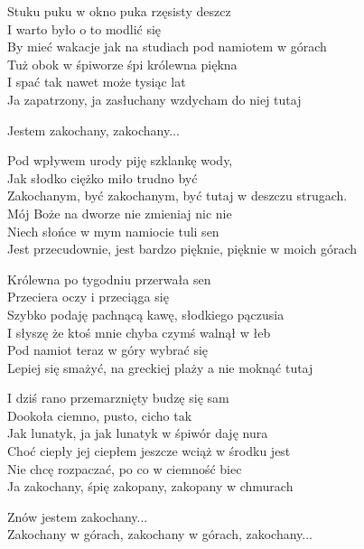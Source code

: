 \begin{text}
 
    Stuku puku w okno puka rzęsisty deszcz\\
    I warto było o to modlić się\\
    By mieć wakacje jak na studiach pod namiotem w górach \\
    Tuż obok w śpiworze śpi królewna piękna\\
    I spać tak nawet może tysiąc lat\\
    Ja zapatrzony, ja zasłuchany wzdycham do niej tutaj

    Jestem zakochany, zakochany...

    Pod wpływem urody piję szklankę wody,\\
    Jak słodko ciężko miło trudno być\\
    Zakochanym, być zakochanym, być tutaj w deszczu strugach.\\
    Mój Boże na dworze nie zmieniaj nic nie\\
    Niech słońce w mym namiocie tuli sen\\
    Jest przecudownie, jest bardzo pięknie, pięknie w moich górach

    Królewna po tygodniu przerwała sen\\
    Przeciera oczy i przeciąga się\\
    Szybko podaję pachnącą kawę, słodkiego pączusia\\
    I słyszę że ktoś mnie chyba czymś walnął w łeb\\
    Pod namiot teraz w góry wybrać się\\
    Lepiej się smażyć, na greckiej plaży a nie moknąć tutaj

    I dziś rano przemarznięty budzę się sam\\
    Dookoła ciemno, pusto, cicho tak\\
    Jak lunatyk, ja jak lunatyk w śpiwór daję nura\\
    Choć ciepły jej ciepłem jeszcze wciąż w środku jest\\
    Nie chcę rozpaczać, po co w ciemność biec\\
    Ja zakochany, śpię zakopany, zakopany w chmurach

    Znów jestem zakochany...	\\
    Zakochany w górach, zakochany w górach, zakochany...


\end{text}
